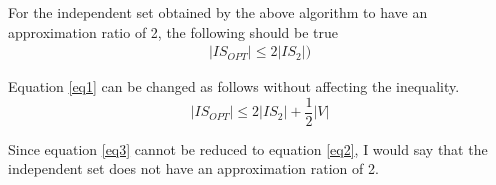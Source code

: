 \documentclass[paper=a4, fontsize=11pt]{scrartcl} %
\numberwithin{figure}{section} %
\numberwithin{table}{section} %
\begin{document}
\begin{enumerate}
For the independent set obtained by the above algorithm to have an approximation ratio of 2, the following should be true
\begin{align}
\label{eq2} 
\left | IS_{OPT} \right | \leq 2 \left | IS_2 \right |)
\end{align}

Equation \ref{eq1} can be changed as follows without affecting the inequality.
\begin{equation} 
\label{eq3}
\left | IS_{OPT} \right | \leq 2 \left | IS_2 \right | + \frac{1}{2} \left | V \right |
\end{equation}

Since equation \ref{eq3} cannot be reduced to equation \ref{eq2}, I would say that the independent set does not have an approximation ration of 2.
\end{enumerate}

\end{document}

